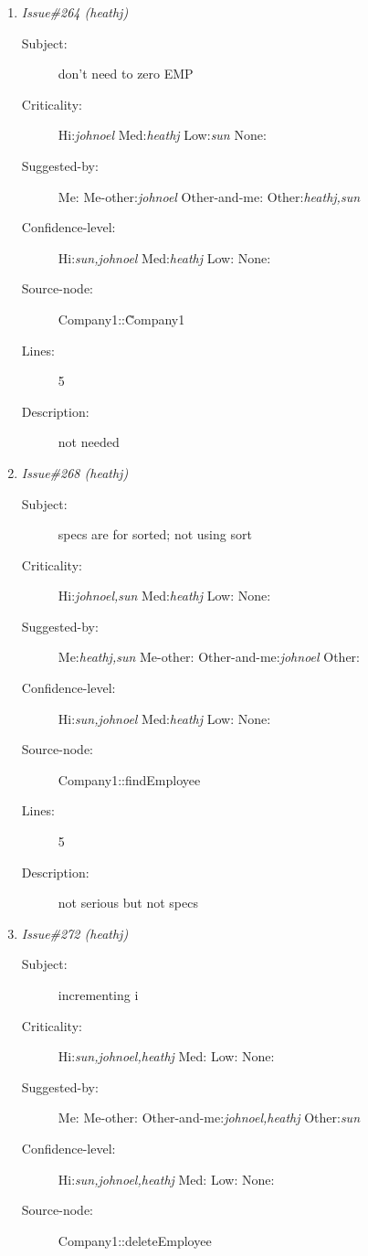 \begin{enumerate}
\begin{description}
\item [Lines:] 6-7

\item [Description:] counting error
\end{description}
\item {\it Issue\#264 (heathj)}
\begin{description}
\item [Subject:] don't need to zero EMP
\item [Criticality:] Hi:{\it johnoel} Med:{\it heathj} Low:{\it sun} None:{\it }
\item [Suggested-by:] Me:{\it } Me-other:{\it johnoel} Other-and-me:{\it } Other:{\it heathj,sun}
\item [Confidence-level:] Hi:{\it sun,johnoel} Med:{\it heathj} Low:{\it } None:{\it }
\item [Source-node:] Company1::\~Company1

\item [Lines:] 5

\item [Description:] not needed
\end{description}
\item {\it Issue\#268 (heathj)}
\begin{description}
\item [Subject:] specs are for sorted; not using sort
\item [Criticality:] Hi:{\it johnoel,sun} Med:{\it heathj} Low:{\it } None:{\it }
\item [Suggested-by:] Me:{\it heathj,sun} Me-other:{\it } Other-and-me:{\it johnoel} Other:{\it }
\item [Confidence-level:] Hi:{\it sun,johnoel} Med:{\it heathj} Low:{\it } None:{\it }
\item [Source-node:] Company1::findEmployee

\item [Lines:] 5

\item [Description:] not serious but not specs
\end{description}
\item {\it Issue\#272 (heathj)}
\begin{description}
\item [Subject:] incrementing i
\item [Criticality:] Hi:{\it sun,johnoel,heathj} Med:{\it } Low:{\it } None:{\it }
\item [Suggested-by:] Me:{\it } Me-other:{\it } Other-and-me:{\it johnoel,heathj} Other:{\it sun}
\item [Confidence-level:] Hi:{\it sun,johnoel,heathj} Med:{\it } Low:{\it } None:{\it }
\item [Source-node:] Company1::deleteEmployee


\end{description}
\end{enumerate}
